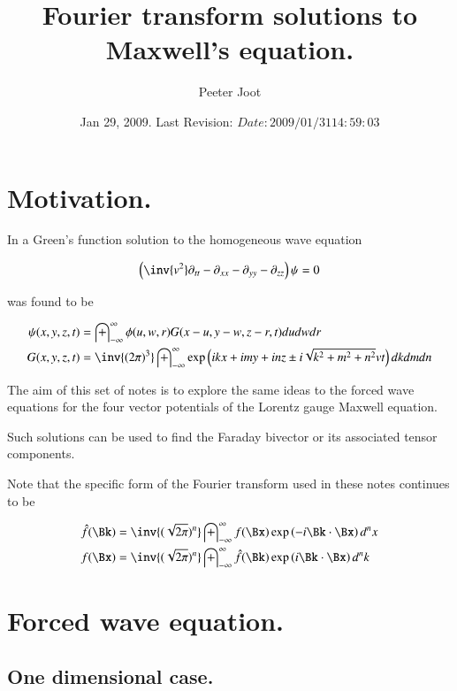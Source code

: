 \documentclass{article}
\title{ Fourier transform solutions to Maxwell's equation. }
\author{Peeter Joot}
\date{ Jan 29, 2009.  Last Revision: $Date: 2009/01/31 14:59:03 $ }
\newcommand{\IIinf}[0]{ \int_{-\infty}^\infty }
\begin{document}
\maketitle{}

\tableofcontents
\section{ Motivation. }

In \cite{PJwaveFourier} a Green's function solution to the homogeneous
wave equation

\begin{align}\label{eqn:wave}
\left(\inv{v^2} \partial_{tt} -\partial_{xx} -\partial_{yy} -\partial_{zz} \right)\psi = 0
\end{align}

was found to be

\begin{align}\label{eqn:greensSolution3d}
{\psi}(x,y,z,t) &= \IIinf \phi(u,w,r) G( x-u, y-w, z-r, t) du dw dr \\
G(x,y,z,t) &= \inv{({2\pi})^3} \IIinf \exp\left( i k x + i m y + i n z \pm i \sqrt{k^2 + m^2 + n^2} v t \right) dk dm dn
\end{align}

The aim of this set of notes is to explore the same ideas to the forced wave
equations for the four vector potentials of the Lorentz gauge Maxwell equation.

Such solutions can be used to find the Faraday bivector or its associated
tensor components.

Note that the specific form of the Fourier transform used in these notes continues to be

\begin{align}
\hat{f}(\Bk) &= \inv{(\sqrt{2\pi})^n} \IIinf f(\Bx) \exp\left( -i \Bk \cdot \Bx \right) d^n x \\
{f}(\Bx) &= \inv{(\sqrt{2\pi})^n} \IIinf \hat{f}(\Bk) \exp\left( i \Bk \cdot \Bx \right) d^n k
\end{align}

\section{ Forced wave equation. }

\subsection{ One dimensional case. }
\end{document}
